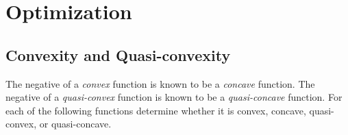 \renewcommand{\chaptername}{Assignment}
\chapter{Optimization}


\section{Convexity and Quasi-convexity}
The negative of a \emph{convex} function is known to be a \emph{concave} function.
The negative of a \emph{quasi-convex} function is known to be a \emph{quasi-concave} function.
For each of the following functions determine whether it is convex, concave, quasi-convex, or quasi-concave.
